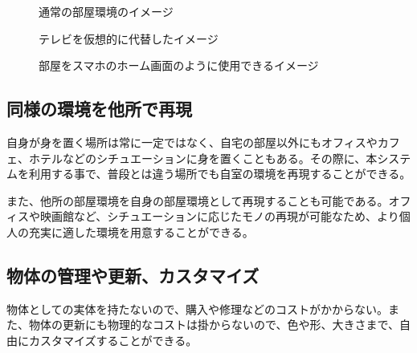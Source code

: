 \begin{figure}[htbp]
    \begin{center}
    \end{center}
    \caption{通常の部屋環境のイメージ}
    \label{fig:normal-room}
  \end{figure}

\begin{figure}[htbp]
    \begin{minipage}{0.5\hsize}
      \begin{center}
      \end{center}
      \label{fig:bigTV}
      \caption{テレビを仮想的に代替したイメージ}
    \end{minipage}
    \begin{minipage}{0.5\hsize}
      \begin{center}
      \end{center}
      \caption{部屋をスマホのホーム画面のように使用できるイメージ}
      \label{fig:widget}
    \end{minipage}
\end{figure}

\subsection{同様の環境を他所で再現}

自身が身を置く場所は常に一定ではなく、自宅の部屋以外にもオフィスやカフェ、ホテルなどのシチュエーションに身を置くこともある。その際に、本システムを利用する事で、普段とは違う場所でも自室の環境を再現することができる。

また、他所の部屋環境を自身の部屋環境として再現することも可能である。オフィスや映画館など、シチュエーションに応じたモノの再現が可能なため、より個人の充実に適した環境を用意することができる。

\subsection{物体の管理や更新、カスタマイズ}

物体としての実体を持たないので、購入や修理などのコストがかからない。また、物体の更新にも物理的なコストは掛からないので、色や形、大きさまで、自由にカスタマイズすることができる。

